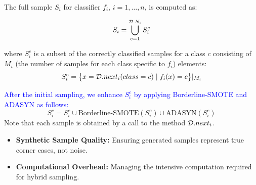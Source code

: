 The full sample $S_i$ for classifier $f_i$, $i=1,\dots,n$, is computed as:

\begin{equation}
S_i = \bigcup_{c=1}^{\mathcal{D}.N_i} S_i^c
\end{equation}

where $S_i^c$ is a subset of the correctly classified samples for a class $c$ consisting of $M_i$ (the number of samples for each class specific to $f_i$) elements:
\[S_i^c = \big\{x = \mathcal{D}.next_i(class=c)\mid f_i(x)=c\big\}|_{M_i}\]

\textcolor{blue}{After the initial sampling, we enhance $S_i^c$ by applying Borderline-SMOTE and ADASYN as follows:}
\[
S_i^c = S_i^c \cup \text{Borderline-SMOTE}(S_i^c) \cup \text{ADASYN}(S_i^c)
\]
Note that each sample is obtained by a call to the method $\mathcal{D}.next_i$.


\begin{tcolorbox}[colback=purple!2!white, colframe=purple, title=Challenges in Sampling]
  \begin{itemize}
    \item \textbf{Synthetic Sample Quality:} Ensuring generated samples represent true corner cases, not noise.
    \item \textbf{Computational Overhead:} Managing the intensive computation required for hybrid sampling.
  \end{itemize}
\end{tcolorbox}


